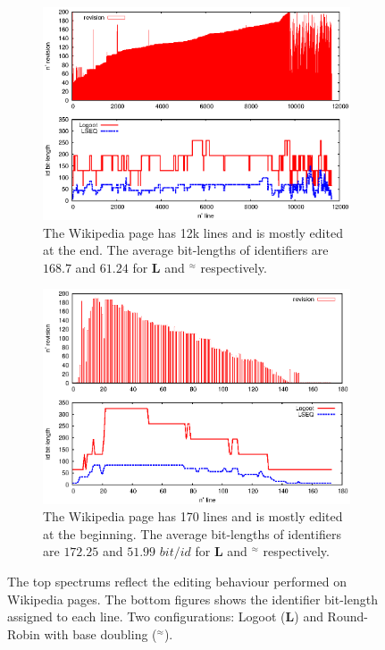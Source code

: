 \begin{figure}
\addtolength{\belowcaptionskip}{-5pt}
\begin{subfigure}[l]{0.47\textwidth}
  \includegraphics[width=\textwidth]{img/poste.eps}
  \caption{The Wikipedia page has 12k lines and is mostly edited at the
    end. The average bit-lengths of identifiers are $168.7$ and $61.24$ for
    \textbf{L} and \textbf{\NAME{}}$^\approx$ respectively.}
  \label{im:poste}
\end{subfigure}
\hfill
\begin{subfigure}[r]{0.47\textwidth}
\includegraphics[width=\textwidth]{img/didyouknow.eps}
\caption{The Wikipedia page has 170 lines and is mostly edited at the
  beginning. The average bit-lengths of identifiers are $172.25$ and $51.99$
  $bit/id$ for  \textbf{L} and \textbf{\NAME{}$^\approx$} respectively.}
\label{im:didyouknow}
\end{subfigure}
\caption{The top spectrums reflect the editing behaviour performed on Wikipedia
  pages. The bottom figures shows the identifier bit-length assigned to each
  line. Two configurations: Logoot (\textbf{L}) and Round-Robin with base
  doubling (\textbf{\NAME{}}$^\approx$).}
\end{figure}

